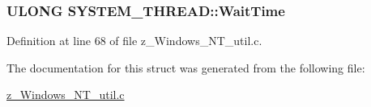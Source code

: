 \hypertarget{structSYSTEM__THREAD_ab2667faeff575d5a37ff360237e1d65e}{
\subsubsection[{Wait\-Time}]{\setlength{\rightskip}{0pt plus 5cm}U\-L\-O\-N\-G S\-Y\-S\-T\-E\-M\-\_\-\-T\-H\-R\-E\-A\-D\-::\-Wait\-Time}}\label{structSYSTEM__THREAD_ab2667faeff575d5a37ff360237e1d65e}


Definition at line 68 of file z\-\_\-\-Windows\-\_\-\-N\-T\-\_\-util.\-c.



The documentation for this struct was generated from the following file\-:\begin{DoxyCompactItemize}
\item 
\hyperlink{z__Windows__NT__util_8c}{z\-\_\-\-Windows\-\_\-\-N\-T\-\_\-util.\-c}\end{DoxyCompactItemize}
